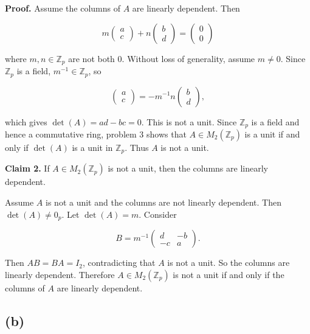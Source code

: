 \textbf{Proof.} Assume the columns of \(A\) are linearly dependent. Then

\[m\begin{pmatrix}
a \\
c
\end{pmatrix} + n\begin{pmatrix}
b \\
d
\end{pmatrix} = \begin{pmatrix}
0 \\
0
\end{pmatrix}\]

where \(m,n \in \mathbb{Z}_{p}\) are not both \(0\). Without loss of generality, assume \(m \neq 0\). Since \(\mathbb{Z}_{p}\) is a field, \(m^{- 1} \in \mathbb{Z}_{p}\), so

\[\begin{pmatrix}
a \\
c
\end{pmatrix} = - m^{- 1}n\begin{pmatrix}
b \\
d
\end{pmatrix},\]

which gives \(\det(A) = ad - bc = 0\). This is not a unit. Since \(\mathbb{Z}_{p}\) is a field and hence a commutative ring, problem 3 shows that \(A \in M_{2}\left( \mathbb{Z}_{p} \right)\) is a unit if and only if \(\det(A)\) is a unit in \(\mathbb{Z}_{p}\). Thus \(A\) is not a unit.

\textbf{Claim 2.} If \(A \in M_{2}\left( \mathbb{Z}_{p} \right)\) is not a unit, then the columns are linearly dependent.

Assume \(A\) is not a unit and the columns are not linearly dependent. Then \(\det(A) \neq 0_{p}\). Let \(\det(A) = m\). Consider

\[B = m^{- 1}\begin{pmatrix}
d & {- b} \\
{- c} & a
\end{pmatrix}.\]

Then \(AB = BA = I_{2}\), contradicting that \(A\) is not a unit. So the columns are linearly dependent. Therefore \(A \in M_{2}\left( \mathbb{Z}_{p} \right)\) is not a unit if and only if the columns of \(A\) are linearly dependent.

\subsection{(b)}

